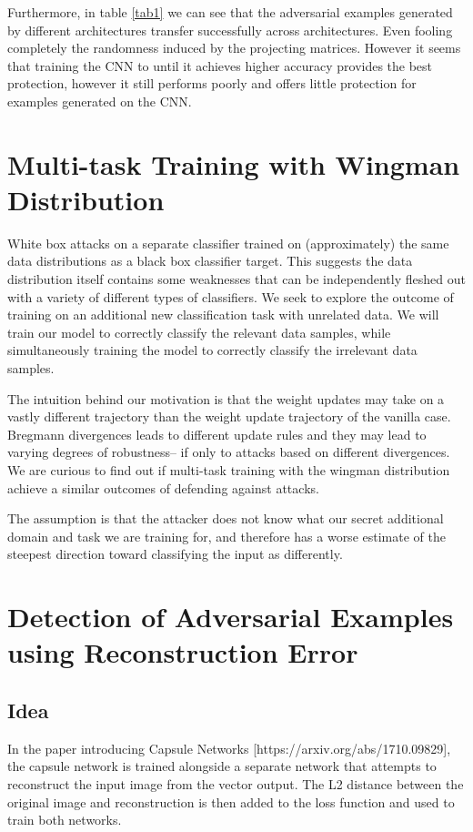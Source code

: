 \documentclass{asaproc}
\begin{document}
Furthermore, in table \ref{tab1} we can see that the adversarial examples generated by different architectures transfer successfully across architectures. Even fooling completely the randomness induced by the projecting matrices. However it seems that training the CNN to until it achieves higher accuracy provides the best protection, however it still performs poorly and offers little protection for examples generated on the CNN.   

\section*{Multi-task Training with Wingman Distribution}

White box attacks on a separate classifier trained on (approximately) the same data distributions as a black box classifier target. This suggests the data distribution itself contains some weaknesses that can be independently fleshed out with a variety of different types of classifiers. We seek to explore the outcome of training on an additional new classification task with unrelated data. We will train our model to correctly classify the relevant data samples, while simultaneously training the model to correctly classify the irrelevant data samples.

The intuition behind our motivation is that the weight updates may take on a vastly different trajectory than the weight update trajectory of the vanilla case. Bregmann divergences leads to different update rules and they may lead to varying degrees of robustness– if only to attacks based on different divergences. We are curious to find out if multi-task training with the wingman distribution achieve a similar outcomes of defending against attacks.

The assumption is that the attacker does not know what our secret additional domain and task we are training for, and therefore has a worse estimate of the steepest direction toward classifying the input as differently.

\section*{Detection of Adversarial Examples using Reconstruction Error}

\subsection*{Idea}

In the paper introducing Capsule Networks [https://arxiv.org/abs/1710.09829], the capsule network is trained alongside a separate network that attempts to reconstruct the input image from the vector output. The L2 distance between the original image and reconstruction is then added to the loss function and used to train both networks.
\end{document}
